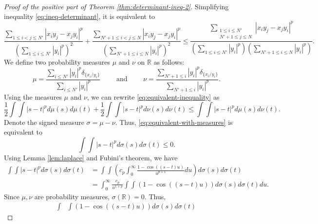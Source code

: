 \documentclass[11pt,a4paper]{amsart}
\theoremstyle{plain}
\theoremstyle{definition}
\newcommand{\R}{\mathbb R}
\begin{document}
\begin{proof}[Proof of the positive part of Theorem \ref{thm:determinant-ineq-2}]
    Simplifying inequality \eqref{eq:ineq-determinant}, it is equivalent to
    \begin{equation}
\label{eq:equivalent-inequality}
\frac{\displaystyle\sum_{1\le i<j\le N'}
      \!\!\!|x_i y_j-x_j y_i|^p}
     {\left(\displaystyle\sum_{1\le i\le N'}|y_i|^p\right)^2}
+
\frac{\displaystyle\sum_{N'+1\le i<j\le N}
    \!\!\!  |x_i y_j-x_j y_i|^p}
     {\left(\displaystyle\sum_{N'+1\le i\le N}|y_i|^p\right)^2}
\leq
\frac{\displaystyle\sum_{\substack{1\le i\le N'\\
                N'+1\le j\le N}}
     \!\!\!\!\!\! |x_i y_j-x_j y_i|^p}
     {\left(\displaystyle\sum_{1\le i\le N'}\!\!\!|y_i|^p\right)\!\!
      \left(\displaystyle\sum_{N'+1\le i\le N}\!\!\!|y_i|^p\right)}.
\end{equation}
    We define two probability measures $\mu$ and $\nu $ on $\R$ as follows:
    \[
        \mu = \frac{\displaystyle\sum_{i \leq N'}|y_i|^p \delta_{\{x_i/y_i\}}}{\displaystyle\sum_{i \leq N'}|y_i|^p}  \qquad \text { and } \qquad 
        \nu = \frac{\displaystyle\sum_{N'+1\leq i }|y_i|^p \delta_{\{x_i/y_i\}}}{\displaystyle\sum_{N'+1\leq i }|y_i|^p} .
    \]
    Using the measures $\mu $ and $\nu$, we can rewrite \eqref{eq:equivalent-inequality} as
    \begin{equation}
        \label{eq:equivalent-with-measures}
    \frac{1}{2} \int \int |s-t|^p d \mu(s) d \mu(t) +\frac{1}{2} \int \int |s-t|^p d \nu(s) d \nu(t) \leq \int \int |s-t|^p d \mu(s) d \nu(t).
    \end{equation}
    Denote the signed measure $\sigma = \mu -\nu$. Thus, \eqref{eq:equivalent-with-measures} is equivalent to
    \begin{equation} \label{eq:equivalent-with-sign-measure}
        \int \int |s-t|^p d \sigma(s) d \sigma(t) \leq 0.
    \end{equation}
    Using Lemma \ref{lem:laplace} and Fubini's theorem, we have
    \begin{align}
        \int \int |s-t|^p d \sigma(s) d \sigma(t) &= \int \int \left(
        c_p \int_{0}^\infty \frac{1 - \cos ((s-t)u)}{u^{p+1}} du \right)
        d \sigma(s) d \sigma(t)
        \\
        &=  \int_{0}^\infty \frac{c_p}{u^{1+p}}\int \int 
        (1 - \cos ((s-t)u)) 
        d \sigma(s) d \sigma(t) du.
    \end{align}
    Since $\mu,\nu$ are probability measures, $\sigma(\R) = 0$. Thus,
    \begin{align}
        \int &\int 
        (1 - \cos ((s-t)u)) 
        d \sigma(s) d \sigma(t) 

\end{align}
\end{proof}
\end{document}

